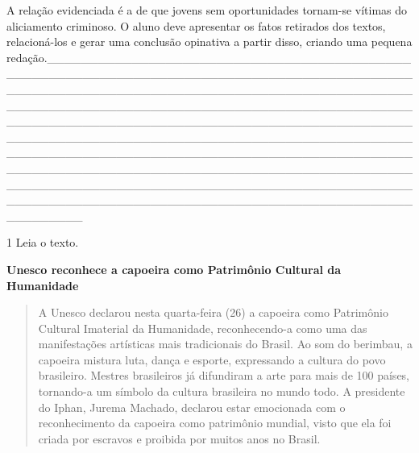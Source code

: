{A relação evidenciada é a de que jovens sem oportunidades tornam-se
vítimas do aliciamento criminoso. O aluno deve apresentar os fatos
retirados dos textos, relacioná-los e gerar uma conclusão opinativa a
partir disso, criando uma pequena
redação.\_\_\_\_\_\_\_\_\_\_\_\_\_\_\_\_\_\_\_\_\_\_\_\_\_\_\_\_\_\_\_\_\_\_\_\_\_\_\_\_\_\_\_\_\_\_\_\_\_\_\_\_\_\_\_\_\_\_\_\_\_\_\_\_\_\_\_\_\_\_\_\_\_\_\_\_\_\_\_\_\_\_\_\_\_\_\_\_\_\_\_\_\_\_\_\_\_\_\_\_\_\_\_\_\_\_\_\_\_\_\_\_\_\_\_\_\_\_\_\_\_\_\_\_\_\_\_\_\_\_\_\_\_\_\_\_\_\_\_\_\_\_\_\_\_\_\_\_\_\_\_\_\_\_\_\_\_\_\_\_\_\_\_\_\_\_\_\_\_\_\_\_\_\_\_\_\_\_\_\_\_\_\_\_\_\_\_\_\_\_\_\_\_\_\_\_\_\_\_\_\_\_\_\_\_\_\_\_\_\_\_\_\_\_\_\_\_\_\_\_\_\_\_\_\_\_\_\_\_\_\_\_\_\_\_\_\_\_\_\_\_\_\_\_\_\_\_\_\_\_\_\_\_\_\_\_\_\_\_\_\_\_\_\_\_\_\_\_\_\_\_\_\_\_\_\_\_\_\_\_\_\_\_\_\_\_\_\_\_\_\_\_\_\_\_\_\_\_\_\_\_\_\_\_\_\_\_\_\_\_\_\_\_\_\_\_\_\_\_\_\_\_\_\_\_\_\_\_\_\_\_\_\_\_\_\_\_\_\_\_\_\_\_\_\_\_\_\_\_\_\_\_\_\_\_\_\_\_\_\_\_\_\_\_\_\_\_\_\_\_\_\_\_\_\_\_\_\_\_\_\_\_\_\_\_\_\_\_\_\_\_\_\_\_\_\_\_\_\_\_\_\_\_\_\_\_\_\_\_\_\_\_\_\_\_\_\_\_\_\_\_\_\_\_\_\_\_\_\_\_\_\_\_\_\_\_\_\_\_\_\_\_\_\_\_\_\_\_\_\_\_\_\_\_\_\_\_\_\_\_\_\_\_\_\_\_\_\_\_\_\_\_\_\_\_\_\_\_\_\_\_\_\_\_\\
}


\num{1} Leia o texto.

\textbf{Unesco reconhece a capoeira como Patrimônio Cultural da Humanidade}

\begin{quote}
A Unesco declarou nesta quarta-feira (26) a capoeira como Patrimônio
Cultural Imaterial da Humanidade, reconhecendo-a como uma das
manifestações artísticas mais tradicionais do Brasil. Ao som do
berimbau, a capoeira mistura luta, dança e esporte, expressando a
cultura do povo brasileiro. Mestres brasileiros já difundiram a arte
para mais de 100 países, tornando-a um símbolo da cultura brasileira no
mundo todo. A presidente do Iphan, Jurema Machado, declarou estar
emocionada com o reconhecimento da capoeira como patrimônio mundial,
visto que ela foi criada por escravos e proibida por muitos anos no
Brasil.
\end{quote}


